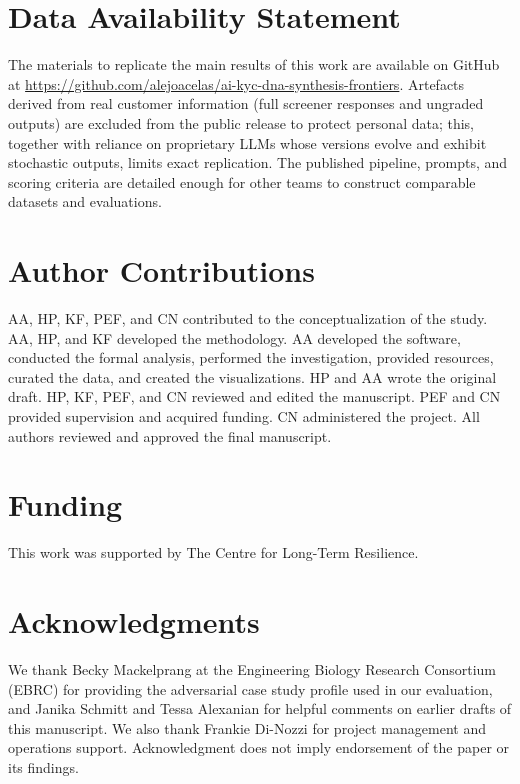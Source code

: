 \documentclass[12pt]{article}
\begin{document}
\section*{Data Availability Statement}

The materials to replicate the main results of this work are available on GitHub at \url{https://github.com/alejoacelas/ai-kyc-dna-synthesis-frontiers}. Artefacts derived from real customer information (full screener responses and ungraded outputs) are excluded from the public release to protect personal data; this, together with reliance on proprietary LLMs whose versions evolve and exhibit stochastic outputs, limits exact replication. The published pipeline, prompts, and scoring criteria are detailed enough for other teams to construct comparable datasets and evaluations.

\section*{Author Contributions}

AA, HP, KF, PEF, and CN contributed to the conceptualization of the study. AA, HP, and KF developed the methodology. AA developed the software, conducted the formal analysis, performed the investigation, provided resources, curated the data, and created the visualizations. HP and AA wrote the original draft. HP, KF, PEF, and CN reviewed and edited the manuscript. PEF and CN provided supervision and acquired funding. CN administered the project. All authors reviewed and approved the final manuscript.

\section*{Funding}

This work was supported by The Centre for Long-Term Resilience.

\section*{Acknowledgments}

We thank Becky Mackelprang at the Engineering Biology Research Consortium (EBRC) for providing the adversarial case study profile used in our evaluation, and Janika Schmitt and Tessa Alexanian for helpful comments on earlier drafts of this manuscript. We also thank Frankie Di-Nozzi for project management and operations support. Acknowledgment does not imply endorsement of the paper or its findings.
\end{document}

